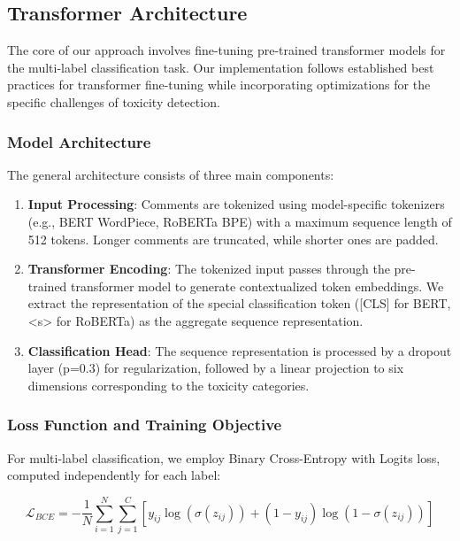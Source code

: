 \documentclass[11pt]{article}
\begin{document}
\subsection{Transformer Architecture}

The core of our approach involves fine-tuning pre-trained transformer models for the multi-label classification task. Our implementation follows established best practices for transformer fine-tuning while incorporating optimizations for the specific challenges of toxicity detection.

\subsubsection{Model Architecture}

The general architecture consists of three main components:

\begin{enumerate}
    \item \textbf{Input Processing}: Comments are tokenized using model-specific tokenizers (e.g., BERT WordPiece, RoBERTa BPE) with a maximum sequence length of 512 tokens. Longer comments are truncated, while shorter ones are padded.
    
    \item \textbf{Transformer Encoding}: The tokenized input passes through the pre-trained transformer model to generate contextualized token embeddings. We extract the representation of the special classification token ([CLS] for BERT, <s> for RoBERTa) as the aggregate sequence representation.
    
    \item \textbf{Classification Head}: The sequence representation is processed by a dropout layer (p=0.3) for regularization, followed by a linear projection to six dimensions corresponding to the toxicity categories.
\end{enumerate}

\subsubsection{Loss Function and Training Objective}

For multi-label classification, we employ Binary Cross-Entropy with Logits loss, computed independently for each label:

\begin{equation}
\mathcal{L}_{BCE} = -\frac{1}{N} \sum_{i=1}^{N} \sum_{j=1}^{C} [y_{ij} \log(\sigma(z_{ij})) + (1-y_{ij}) \log(1-\sigma(z_{ij}))]
\end{equation}
\end{document}
